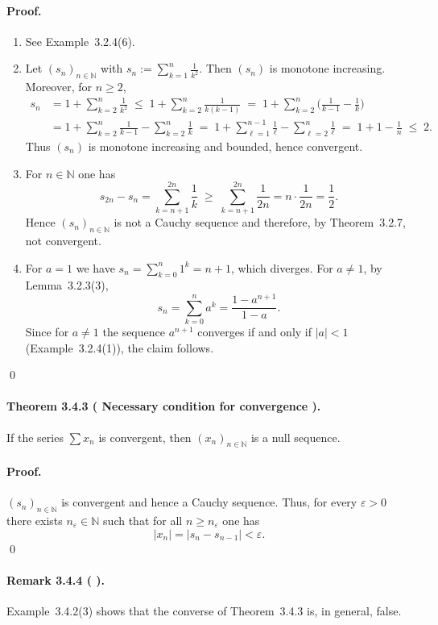\documentclass[12pt]{article}
\newcommand{\N}{\mathbb{N}}
\newcommand{\eps}{\varepsilon}
\newcommand{\NumberedTheorem}[3]{%
\paragraph*{Theorem #1 ( #2 ).} #3\par}
\newcommand{\NumberedRemark}[3]{%
\paragraph*{Remark #1 ( #2 ).} #3\par}
\begin{document}
\paragraph{Proof.}
\begin{enumerate}[label={(\arabic*)}, leftmargin=*]
	\item See Example~3.2.4(6).

	\item Let $(s_n)_{n\in\N}$ with $s_n := \sum_{k=1}^{n} \tfrac{1}{k^2}$. Then $(s_n)$ is monotone increasing. Moreover, for $n\ge2$,
	\begin{align*}
		s_n &= 1 + \sum_{k=2}^{n} \frac{1}{k^2}
			\;\le\; 1 + \sum_{k=2}^{n} \frac{1}{k(k-1)}
			\;=\; 1 + \sum_{k=2}^{n} \Big( \frac{1}{k-1} - \frac{1}{k} \Big) \\
			&= 1 + \sum_{k=2}^{n} \frac{1}{k-1} - \sum_{k=2}^{n} \frac{1}{k}
			\;=\; 1 + \sum_{\ell=1}^{n-1} \frac{1}{\ell} - \sum_{\ell=2}^{n} \frac{1}{\ell}
			\;=\; 1 + 1 - \frac{1}{n}
			\;\le\; 2.
	\end{align*}
	Thus $(s_n)$ is monotone increasing and bounded, hence convergent.

	\item For $n\in\N$ one has
	\[
		s_{2n} - s_n 
			= \sum_{k=n+1}^{2n} \frac{1}{k}
			\;\ge\; \sum_{k=n+1}^{2n} \frac{1}{2n}
			= n\cdot\frac{1}{2n}
			= \frac{1}{2}.
	\]
	Hence $(s_n)_{n\in\N}$ is not a Cauchy sequence and therefore, by Theorem~3.2.7, not convergent.

	\item For $a=1$ we have $s_n = \sum_{k=0}^{n} 1^k = n+1$, which diverges. For $a\ne1$, by Lemma~3.2.3(3),
	\[
		s_n = \sum_{k=0}^{n} a^k = \frac{1-a^{n+1}}{1-a}.
	\]
	Since for $a\ne1$ the sequence $a^{n+1}$ converges if and only if $|a|<1$ (Example~3.2.4(1)), the claim follows.
\end{enumerate}
\qed


\NumberedTheorem{3.4.3}{Necessary condition for convergence}{If the series $\sum x_n$ is convergent, then $(x_n)_{n\in\N}$ is a null sequence.}
\paragraph{Proof.}
$(s_n)_{n\in\N}$ is convergent and hence a Cauchy sequence. Thus, for every $\eps>0$ there exists $n_\eps\in\N$ such that for all $n\ge n_\eps$ one has
\[
	|x_n| = |s_n - s_{n-1}| < \eps.
\]
\qed

\NumberedRemark{3.4.4}{}{Example~3.4.2(3) shows that the converse of Theorem~3.4.3 is, in general, false.}
\end{document}
